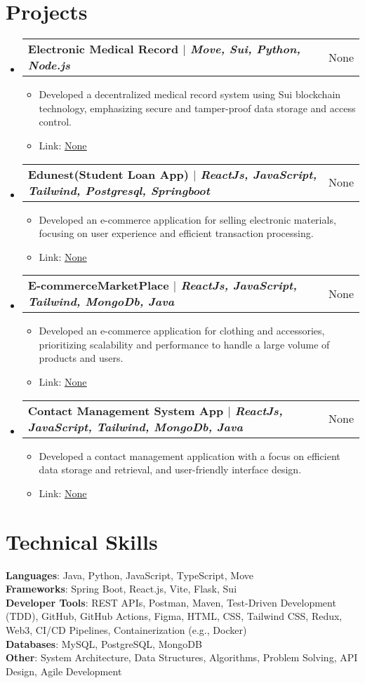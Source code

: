 \documentclass[letterpaper,11pt]{article}
\makeatletter
\newcommand{\resumeItem}[1]{
  \item\small{
    {#1 \vspace{-2pt}}
  }
}
\newcommand{\resumeProjectHeading}[2]{
    \item
    \begin{tabular*}{0.97\textwidth}{l@{\extracolsep{\fill}}r}
      \small#1 & #2 \\
    \end{tabular*}\vspace{-7pt}
}
\newcommand{\resumeSubHeadingListStart}{\begin{itemize}[leftmargin=0.15in, label={}]}
\newcommand{\resumeSubHeadingListEnd}{\end{itemize}}
\newcommand{\resumeItemListStart}{\begin{itemize}}
\newcommand{\resumeItemListEnd}{\end{itemize}\vspace{-5pt}}
\makeatother
\begin{document}
\section{Projects}
    \resumeSubHeadingListStart
      \resumeProjectHeading
          {\textbf{Electronic Medical Record $|$ \emph{Move, Sui, Python, Node.js}}}{None}
          \resumeItemListStart
            \resumeItem{Developed a decentralized medical record system using Sui blockchain technology, emphasizing secure and tamper-proof data storage and access control.}
            \resumeItem{Link: \href{None}{\underline{None}}}
          \resumeItemListEnd
      \resumeProjectHeading
          {\textbf{Edunest(Student Loan App) $|$ \emph{ReactJs, JavaScript, Tailwind, Postgresql, Springboot}}}{None}
          \resumeItemListStart
            \resumeItem{Developed an e-commerce application for selling electronic materials, focusing on user experience and efficient transaction processing.}
            \resumeItem{Link: \href{None}{\underline{None}}}
          \resumeItemListEnd
      \resumeProjectHeading
          {\textbf{E-commerceMarketPlace $|$ \emph{ReactJs, JavaScript, Tailwind, MongoDb, Java}}}{None}
          \resumeItemListStart
            \resumeItem{Developed an e-commerce application for clothing and accessories, prioritizing scalability and performance to handle a large volume of products and users.}
            \resumeItem{Link: \href{None}{\underline{None}}}
          \resumeItemListEnd
      \resumeProjectHeading
          {\textbf{Contact Management System App $|$ \emph{ReactJs, JavaScript, Tailwind, MongoDb, Java}}}{None}
          \resumeItemListStart
            \resumeItem{Developed a contact management application with a focus on efficient data storage and retrieval, and user-friendly interface design.}
            \resumeItem{Link: \href{None}{\underline{None}}}
          \resumeItemListEnd
    \resumeSubHeadingListEnd

\section{Technical Skills}
 \begin{itemize}[leftmargin=0.15in, label={}]
    \small{\item{
     \textbf{Languages}: Java, Python, JavaScript, TypeScript, Move \\
     \textbf{Frameworks}: Spring Boot, React.js, Vite, Flask, Sui \\
     \textbf{Developer Tools}: REST APIs, Postman, Maven, Test-Driven Development (TDD), GitHub, GitHub Actions, Figma, HTML, CSS, Tailwind CSS, Redux, Web3, CI/CD Pipelines, Containerization (e.g., Docker) \\
     \textbf{Databases}: MySQL, PostgreSQL, MongoDB \\
     \textbf{Other}: System Architecture, Data Structures, Algorithms, Problem Solving, API Design, Agile Development
    }}
 \end{itemize}

\end{document}
